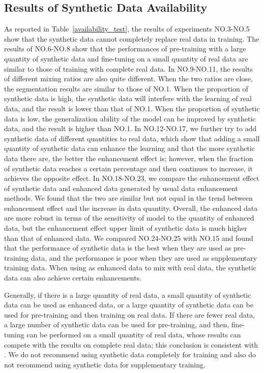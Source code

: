 \documentclass{ecai}
\begin{document}
\subsection{Results of Synthetic Data Availability}
As reported in Table~\ref{availability_test}, the results of experiments NO.3-NO.5 show that the synthetic data cannot completely replace real data in training.           
The results of NO.6-NO.8 show that the performances of pre-training with a large quantity of synthetic data and fine-tuning on a small quantity of real data are similar to those of training with complete real data.  
In NO.9-NO.11, the results of different mixing ratios are also quite different. When the two ratios are close, the segmentation results are similar to those of NO.1. When the proportion of synthetic data is high, the synthetic data will interfere with the learning of real data, and the result is lower than that of NO.1. When the proportion of synthetic data is low, the generalization ability of the model can be improved by synthetic data, and the result is higher than NO.1.           
In NO.12-NO.17, we further try to add synthetic data of different quantities to real data, which show that adding a small quantity of synthetic data can enhance the learning and that the more synthetic data there are, the better the enhancement effect is; however, when the fraction of synthetic data reaches a certain percentage and then continues to increase, it achieves the opposite effect. 
In NO.18-NO.23, we compare the enhancement effect of synthetic data and enhanced data generated by usual data enhancement methods. We found that the two are similar but not equal in the trend between  enhancement effect and the increase in data quantity. Overall, the enhanced data are more robust in terms of the sensitivity of model to the quantity of enhanced data, but the enhancement effect upper limit of synthetic data is much higher than that of enhanced data.  
We compared NO.24-NO.25 with NO.15 and found that the performance of synthetic data is the best when they are used as pre-training data, and the performance is poor when they are used as supplementary training data. When using as enhanced data to mix with real data, the synthetic data can also achieve certain enhancements.

Generally, if there is a large quantity of real data, a small quantity of synthetic data can be used as enhanced data, or a large quantity of synthetic data can be used for pre-training and then training on real data. If there are fewer real data, a large number of synthetic data can be used for pre-training, and then, fine-tuning can be performed on a small quantity of real data, whose results can compete with the results on complete real data; this conclusion is consistent with \cite{4shin2018medical}. We do not recommend using synthetic data completely for training and also do not recommend using synthetic data for supplementary training.
\end{document}
